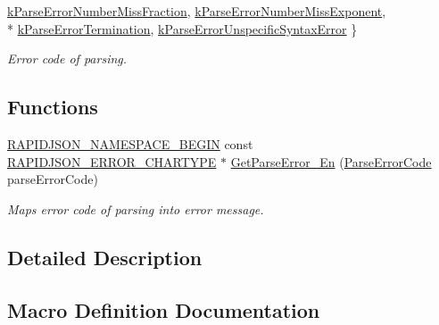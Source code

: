 \begin{DoxyCompactItemize}
\hyperlink{group__RAPIDJSON__ERRORS_gga8d4b32dfc45840bca189ade2bbcb6ba7a08a2cc2b4cacfba1673ed536eee229ce}{k\+Parse\+Error\+Number\+Miss\+Fraction}, 
\hyperlink{group__RAPIDJSON__ERRORS_gga8d4b32dfc45840bca189ade2bbcb6ba7a82cdbd740e22b819a70d05e585c2a442}{k\+Parse\+Error\+Number\+Miss\+Exponent}, 
\\*
\hyperlink{group__RAPIDJSON__ERRORS_gga8d4b32dfc45840bca189ade2bbcb6ba7a6fed2d9a15f88540a1ba785f0de2cbe6}{k\+Parse\+Error\+Termination}, 
\hyperlink{group__RAPIDJSON__ERRORS_gga8d4b32dfc45840bca189ade2bbcb6ba7a2bec6b26bddd3e093a37fc0d6399e0be}{k\+Parse\+Error\+Unspecific\+Syntax\+Error}
 \}\begin{DoxyCompactList}\small\item\em Error code of parsing. \end{DoxyCompactList}
\end{DoxyCompactItemize}
\subsection*{Functions}
\begin{DoxyCompactItemize}
\item 
\hyperlink{group__RAPIDJSON__CONFIG_gad3806c8251fdc7da9618b7e922674ffc}{R\+A\+P\+I\+D\+J\+S\+O\+N\+\_\+\+N\+A\+M\+E\+S\+P\+A\+C\+E\+\_\+\+B\+E\+G\+IN} const \hyperlink{group__RAPIDJSON__ERRORS_ga7e4636fd48d0148f102b8a13f0539d8c}{R\+A\+P\+I\+D\+J\+S\+O\+N\+\_\+\+E\+R\+R\+O\+R\+\_\+\+C\+H\+A\+R\+T\+Y\+PE} $\ast$ \hyperlink{group__RAPIDJSON__ERRORS_ga755b523205f46c980c80d12e230a3abd}{Get\+Parse\+Error\+\_\+\+En} (\hyperlink{group__RAPIDJSON__ERRORS_ga8d4b32dfc45840bca189ade2bbcb6ba7}{Parse\+Error\+Code} parse\+Error\+Code)
\begin{DoxyCompactList}\small\item\em Maps error code of parsing into error message. \end{DoxyCompactList}\end{DoxyCompactItemize}


\subsection{Detailed Description}


\subsection{Macro Definition Documentation}
